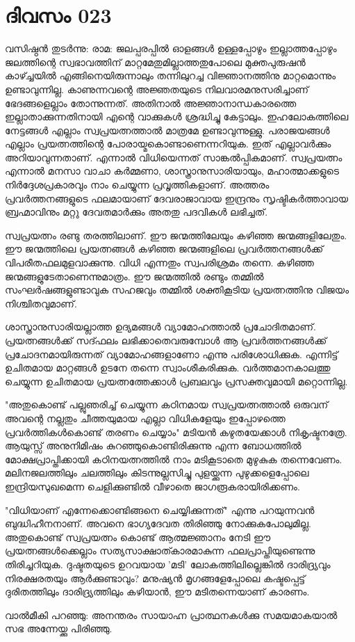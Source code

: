  
\section{ദിവസം 023}


വസിഷ്ഠന്‍ തുടര്‍ന്നു: രാമ: ജലപ്പരപ്പില്‍ ഓളങ്ങള്‍ ഉള്ളപ്പോഴും ഇല്ലാത്തപ്പോഴും ജലത്തിന്റെ സ്വഭാവത്തിന്‌ മാറ്റമേതുമില്ലാത്തതുപോലെ മുക്തപുരുഷന്‍ കാഴ്ച്ചയില്‍ എങ്ങിനെയിരുന്നാലും തന്നിലുറച്ച വിജ്ഞാനത്തിനു മാറ്റമൊന്നും ഉണ്ടാവുന്നില്ല. കാണുന്നവന്റെ അജ്ഞതയുടെ നിലവാരമനുസരിച്ചാണ്‌ ഭേദങ്ങളെല്ലാം തോന്നുന്നത്‌. അതിനാല്‍ അജ്ഞാനാന്ധകാരത്തെ ഇല്ലാതാക്കുന്നതിനായി എന്റെ വാക്കുകള്‍ ശ്രദ്ധിച്ചു കേട്ടാലും. ഇഹലോകത്തിലെ നേട്ടങ്ങള്‍ എല്ലാം സ്വപ്രയത്നത്താല്‍ മാത്രമേ ഉണ്ടാവുന്നുള്ളു. പരാജയങ്ങള്‍ എല്ലാം പ്രയത്നത്തിന്റെ പോരായ്മകൊണ്ടാണെന്നറിയുക. ഇത്‌ എല്ലാവര്‍ക്കും അറിയാവുന്നതാണ്‌. എന്നാല്‍ വിധിയെന്നത്‌ സാങ്കല്‍പ്പികമാണ്‌. സ്വപ്രയത്നം എന്നാല്‍ മനസാ വാചാ കര്‍മ്മണാ, ശാസ്ത്രാനുസാരിയായും, മഹാത്മാക്കളുടെ നിര്‍ദ്ദേശപ്രകാരവും നാം ചെയ്യുന്ന പ്രവൃത്തികളാണ്‌. അത്തരം പ്രവര്‍ത്തനങ്ങളുടെ ഫലമായാണ്‌ ദേവരാജാവായ ഇന്ദ്രനും സൃഷ്ടികര്‍ത്താവായ ബ്രഹ്മാവിനും മറ്റു ദേവതമാര്‍ക്കും അതതു പദവികള്‍ ലഭിച്ചത്‌. 

സ്വപ്രയത്നം രണ്ടു തരത്തിലാണ്‌. ഈ ജന്മത്തിലേയും കഴിഞ്ഞ ജന്മങ്ങളിലേതും. ഈ ജന്മത്തിലെ പ്രയത്നങ്ങള്‍ കഴിഞ്ഞ ജന്മങ്ങളിലെ പ്രവര്‍ത്തനങ്ങള്‍ക്ക്‌ വിപരീതഫലമുളവാക്കുന്നു. വിധി എന്നതും സ്വപരിശ്രമം തന്നെ. കഴിഞ്ഞ ജന്മങ്ങളുടേതാണെന്നുമാത്രം. ഈ ജന്മത്തില്‍ രണ്ടും തമ്മില്‍ സംഘര്‍ഷങ്ങളുണ്ടാവുക സഹജവും തമ്മില്‍ ശക്തികൂടിയ പ്രയത്നത്തിനു വിജയം നിശ്ചിതവുമാണ്‌. 

ശാസ്ത്രാനുസാരിയല്ലാത്ത ഉദ്യമങ്ങള്‍ വ്യാമോഹത്താല്‍ പ്രചോദിതമാണ്‌. പ്രയത്നങ്ങള്‍ക്ക്‌ സദ്ഫലം ലഭിക്കാതെവരുമ്പോള്‍ ആ പ്രവര്‍ത്തനങ്ങള്‍ക്ക്‌ പ്രചോദനമായിരുന്നത്‌ വ്യാമോഹങ്ങളാണോ എന്നു പരിശോധിക്കുക. എന്നിട്ട്‌ ഉചിതമായ മാറ്റങ്ങള്‍ ഉടനേ തന്നെ സ്വാംശീകരിക്കുക. വര്‍ത്തമാനകാലത്തു ചെയ്യുന്ന ഉചിതമായ പ്രയത്നത്തേക്കാള്‍ പ്രബലവും പ്രസക്തവുമായി മറ്റൊന്നില്ല.

"അതുകൊണ്ട്‌ പല്ലുഞരിച്ച്‌ ചെയ്യുന്ന കഠിനമായ സ്വപ്രയത്നത്താല്‍ ഒരുവന്‌ അവന്റെ നല്ലതും ചീത്തയുമായ എല്ലാ വിധികളേയും ഇപ്പോഴത്തെ പ്രവര്‍ത്തികള്‍കൊണ്ട്‌ തരണം ചെയ്യാം" മടിയന്‍ കഴുതയേക്കാള്‍ നികൃഷ്ടനത്രേ. ആയുസ്സ്‌ അനുനിമിഷം കുറഞ്ഞുകൊണ്ടിരിക്കുന്നു എന്ന ബോധത്തില്‍ മോക്ഷപ്രാപ്തിക്കായി കഠിനയത്നത്തില്‍ നാം മടികൂടാതെ മുഴുകുക തന്നെവേണം. മലിനജലത്തിലും ചലത്തിലും കിടന്നുല്ലസിച്ചു പുളയ്ക്കുന്ന പുഴുക്കളെപ്പോലെ ഇന്ദ്രിയസുഖമെന്ന ചെളിക്കുണ്ടില്‍ വീഴാതെ ജാഗരൂകരായിരിക്കണം.

"വിധിയാണ്‌ എന്നേക്കൊണ്ടിങ്ങനെ ചെയ്യിക്കുന്നത്‌" എന്നു പറയുന്നവന്‍ ബുദ്ധിഹീനനാണ്‌. അവനെ ഭാഗ്യദേവത തിരിഞ്ഞു നോക്കുകപോലുമില്ല. അതുകൊണ്ട്‌ സ്വപ്രയത്നം കൊണ്ട്‌ ആത്മജ്ഞാനം നേടി ഈ പ്രയത്നങ്ങള്‍ക്കെല്ലാം സത്യസാക്ഷാത്കാരമാകുന്ന ഫലപ്രാപ്തിയുണ്ടെന്നു തിരിച്ചറിയുക. ദുഷ്ടതയുടെ ഉറവയായ 'മടി' ലോകത്തിലില്ലെങ്കില്‍ ദാരിദ്ര്യവും നിരക്ഷരതയും ആര്‍ക്കുണ്ടാവും? മനുഷ്യന്‍ മൃഗങ്ങളേപ്പോലെ കഷ്ടപ്പെട്ട്‌ ദുരിതത്തിലും ദാരിദ്ര്യത്തിലും കഴിയാന്‍, ഈ മടിതന്നെയാണ് കാരണം. 

വാല്‍മീകി പറഞ്ഞു: അനന്തരം സായാഹ്ന പ്രാത്ഥനകള്‍ക്കു സമയമാകയാല്‍ സഭ അന്നേയ്ക്കു പിരിഞ്ഞു. 
